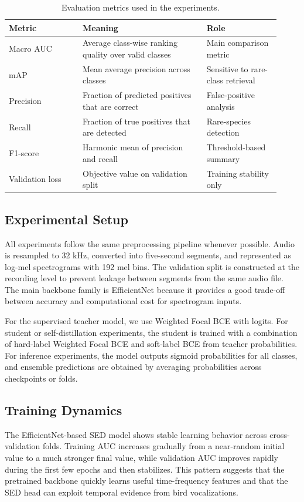 \documentclass[a4paper,12pt]{article}
\begin{document}
\begin{table}[H]
\centering
\caption{Evaluation metrics used in the experiments.}
\begin{tabular}{p{0.25\linewidth} p{0.42\linewidth} p{0.25\linewidth}}
\toprule
\textbf{Metric} & \textbf{Meaning} & \textbf{Role} \\
\midrule
Macro AUC & Average class-wise ranking quality over valid classes & Main comparison metric \\
mAP & Mean average precision across classes & Sensitive to rare-class retrieval \\
Precision & Fraction of predicted positives that are correct & False-positive analysis \\
Recall & Fraction of true positives that are detected & Rare-species detection \\
F1-score & Harmonic mean of precision and recall & Threshold-based summary \\
Validation loss & Objective value on validation split & Training stability only \\
\bottomrule
\end{tabular}
\end{table}

\subsection{Experimental Setup}
All experiments follow the same preprocessing pipeline whenever possible. Audio is resampled to 32 kHz, converted into five-second segments, and represented as log-mel spectrograms with 192 mel bins. The validation split is constructed at the recording level to prevent leakage between segments from the same audio file. The main backbone family is EfficientNet because it provides a good trade-off between accuracy and computational cost for spectrogram inputs.

For the supervised teacher model, we use Weighted Focal BCE with logits. For student or self-distillation experiments, the student is trained with a combination of hard-label Weighted Focal BCE and soft-label BCE from teacher probabilities. For inference experiments, the model outputs sigmoid probabilities for all classes, and ensemble predictions are obtained by averaging probabilities across checkpoints or folds.

\subsection{Training Dynamics}
The EfficientNet-based SED model shows stable learning behavior across cross-validation folds. Training AUC increases gradually from a near-random initial value to a much stronger final value, while validation AUC improves rapidly during the first few epochs and then stabilizes. This pattern suggests that the pretrained backbone quickly learns useful time-frequency features and that the SED head can exploit temporal evidence from bird vocalizations.
\end{document}
